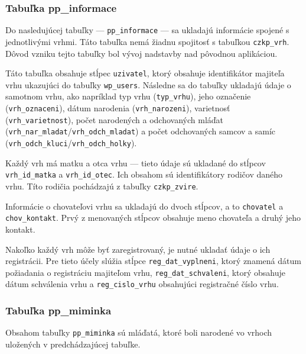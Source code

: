 \subsubsection{Tabuľka pp\_informace}

Do nasledujúcej tabuľky --- \texttt{pp_informace} --- sa ukladajú informácie spojené s jednotlivými vrhmi. Táto tabuľka nemá žiadnu spojitosť s tabuľkou \texttt{czkp_vrh}. Dôvod vzniku tejto tabuľky bol vývoj nadstavby nad pôvodnou aplikáciou.

Táto tabuľka obsahuje stĺpec \texttt{uzivatel}, ktorý obsahuje identifikátor majiteľa vrhu ukazujúci do tabuľky \texttt{wp_users}. Následne sa do tabuľky ukladajú údaje o samotnom vrhu, ako napríklad typ vrhu (\texttt{typ_vrhu}), jeho označenie (\texttt{vrh_oznaceni}), dátum narodenia (\texttt{vrh_narozeni}), varietnosť \\(\texttt{vrh_varietnost}), počet narodených a odchovaných mláďat \\ (\texttt{vrh_nar_mladat}/\texttt{vrh_odch_mladat}) a počet odchovaných samcov a samíc (\texttt{vrh_odch_kluci}/\texttt{vrh_odch_holky}).

Každý vrh má matku a otca vrhu --- tieto údaje sú ukladané do stĺpcov \texttt{vrh_id_matka} a \texttt{vrh_id_otec}. Ich obsahom sú identifikátory rodičov daného vrhu. Títo rodičia pochádzajú z tabuľky \texttt{czkp_zvire}.

Informácie o chovateľovi vrhu sa ukladajú do dvoch stĺpcov, a to \texttt{chovatel} a \texttt{chov_kontakt}. Prvý z menovaných stĺpcov obsahuje meno chovateľa a druhý jeho kontakt.

Nakoľko každý vrh môže byť zaregistrovaný, je nutné ukladať údaje o ich registrácii. Pre tieto účely slúžia stĺpce  \texttt{reg_dat_vyplneni}, ktorý znamená dátum požiadania o registráciu majiteľom vrhu, \texttt{reg_dat_schvaleni}, ktorý obsahuje dátum schválenia vrhu a \texttt{reg_cislo_vrhu} obsahujúci registračné číslo vrhu.

\subsubsection{Tabuľka pp\_miminka}

Obsahom tabuľky \texttt{pp_miminka} sú mláďatá, ktoré boli narodené vo vrhoch uložených v predchádzajúcej tabuľke.

